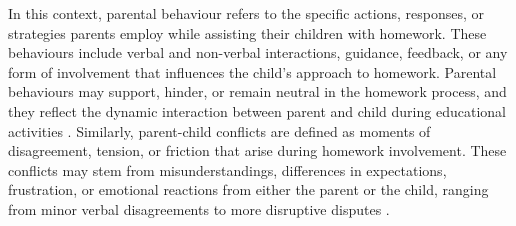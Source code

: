 
In this context, parental behaviour refers to the specific actions, responses, or strategies parents employ while assisting their children with homework. These behaviours include verbal and non-verbal interactions, guidance, feedback, or any form of involvement that influences the child's approach to homework. Parental behaviours may support, hinder, or remain neutral in the homework process, and they reflect the dynamic interaction between parent and child during educational activities \cite{cunha2015parents,eccles2013family}.
Similarly, parent-child conflicts are defined as moments of disagreement, tension, or friction that arise during homework involvement. These conflicts may stem from misunderstandings, differences in expectations, frustration, or emotional reactions from either the parent or the child, ranging from minor verbal disagreements to more disruptive disputes \cite{grolnick2009issues,benckwitz2023reciprocal,hanh2023current}.







